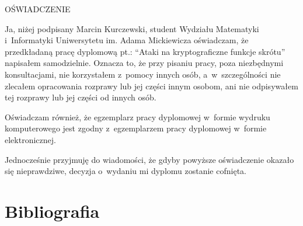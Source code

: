\documentclass[12pt,a4paper,twoside]{article}
\begin{document}
\newpage
\thispagestyle{empty}
\begin{center}
    OŚWIADCZENIE
\end{center}

Ja, niżej podpisany Marcin Kurczewski, student Wydziału Matematyki
i~Informatyki Uniwersytetu im. Adama Mickiewicza oświadczam, że przedkładaną
pracę dyplomową pt.: ``Ataki na kryptograficzne funkcje skrótu'' napisałem
samodzielnie. Oznacza to, że przy pisaniu pracy, poza niezbędnymi
konsultacjami, nie korzystałem z~pomocy innych osób, a~w~szczególności nie
zlecałem opracowania rozprawy lub jej części innym osobom, ani nie odpisywałem
tej rozprawy lub jej części od innych osób.

Oświadczam również, że egzemplarz pracy dyplomowej w~formie wydruku
komputerowego jest zgodny z~egzemplarzem pracy dyplomowej w~formie
elektronicznej.

Jednocześnie przyjmuję do wiadomości, że gdyby powyższe oświadczenie okazało
się nieprawdziwe, decyzja o~wydaniu mi dyplomu zostanie cofnięta.


\newpage
\setcounter{tocdepth}{3}
\tableofcontents

\newpage
\pagestyle{fancy}









\newpage
\section{Bibliografia}
\begingroup
\renewcommand{\section}[2]{}


\endgroup
\end{document}
